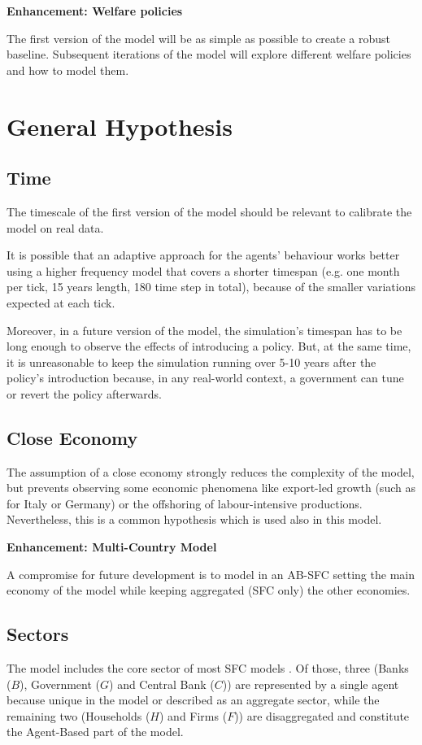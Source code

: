 \documentclass[a4paper, headings=standardclasses]{scrartcl}
\newenvironment{enh}[1][]{\begin{framed}\noindent\textbf{Enhancement: #1}\par}{\end{framed}}
\begin{document}
\begin{enh}[Welfare policies]
	The first version of the model will be as simple as possible to create a robust baseline.
	Subsequent iterations of the model will explore different welfare policies and how to model them.
\end{enh}

\section{General Hypothesis}
\subsection{Time}
The timescale of the first version of the model should be relevant to calibrate the model on real data.

It is possible that an adaptive approach for the agents' behaviour works better using a higher frequency model that covers a shorter timespan (e.g. one month per tick, 15 years length, 180 time step in total), because of the smaller variations expected at each tick.

Moreover, in a future version of the model, the simulation's timespan has to be long enough to observe the effects of introducing a policy. But, at the same time, it is unreasonable to keep the simulation running over 5-10 years after the policy's introduction because, in any real-world context, a government can tune or revert the policy afterwards.

\subsection{Close Economy}
The assumption of a close economy strongly reduces the complexity of the model, but prevents observing some economic phenomena like export-led growth (such as for Italy or Germany) or the offshoring of labour-intensive productions.
Nevertheless, this is a common hypothesis which is used also in this model.

\begin{enh}[Multi-Country Model]
	A compromise for future development is to model in an AB-SFC setting the main economy of the model while keeping aggregated (SFC only) the other economies.
\end{enh}

\subsection{Sectors}
The model includes the core sector of most SFC models \parencite{nikiforos2017}. Of those, three (Banks ($B$), Government ($G$) and Central Bank ($C$)) are represented by a single agent because unique in the model or described as an aggregate sector, while the remaining two (Households ($H$) and Firms ($F$)) are disaggregated and constitute the Agent-Based part of the model.
\end{document}
